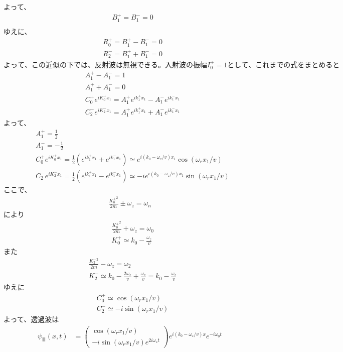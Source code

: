 よって、
\begin{align}
&B_{1}^{+}=B_{1}^{-}=0 \\
\end{align}
ゆえに、
\begin{align}
&R_{0}^{+}=B_{1}^{+}-B_{1}^{-}=0 \\
&R_{2}^{-}=B_{1}^{+}+B_{1}^{-}=0
\end{align}
$よって、この近似の下では、反射波は無視できる。入射波の振幅I_{0}^{+}=1として、これまでの式をまとめると$
\begin{align}
&A_{1}^{+}-A_{1}^{-}=1 \\
&A_{1}^{+}+A_{1}^{-}=0 \\
&C_{0}^{+}e^{iK_{0}^{+}x_{1}}=A_{1}^{+}e^{ik_{1}^{+}x_{1}}-A_{1}^{-}e^{ik_{1}^{-}x_{1}} \\
&C_{2}^{-}e^{iK_{2}^{-}x_{1}}=A_{1}^{+}e^{ik_{1}^{+}x_{1}}+A_{1}^{-}e^{ik_{1}^{-}x_{1}}
\end{align}
よって、
\begin{align}
&A_{1}^{+}=\frac{1}{2} \\
&A_{1}^{-}=-\frac{1}{2} \\
&C_{0}^{+}e^{iK_{0}^{+}x_{1}}=\frac{1}{2}(e^{ik_{1}^{+}x_{1}}+e^{ik_{1}^{-}x_{1}}){\simeq}e^{i(k_{0}-{\omega_{z}}/{v})x_{1}}\cos{({\omega_{r}}x_{1}/{v})} \\
&C_{2}^{-}e^{iK_{2}^{-}x_{1}}=\frac{1}{2}(e^{ik_{1}^{+}x_{1}}-e^{ik_{1}^{-}x_{1}}){\simeq}-ie^{i(k_{0}-{\omega_{z}}/{v})x_{1}}\sin{({\omega_{r}}x_{1}/{v})}
\end{align}
ここで、
\begin{align}
\frac{{K_{n}^{\pm}}^2}{2m}{\pm}\omega_{z}=\omega_{n}
\end{align}
により
\begin{align}
&\frac{{K_{0}^{+}}^2}{2m}+\omega_{z}=\omega_{0} \\
&K_{0}^{+}{\simeq}k_{0}-\frac{\omega_{z}}{v}
\end{align}
また
\begin{align}
&\frac{{K_{2}^{-}}^2}{2m}-\omega_{z}=\omega_{2} \\
&K_{2}^{-}{\simeq}k_{0}-\frac{2\omega_{z}}{v}+\frac{\omega_{z}}{v}=k_{0}-\frac{\omega_{z}}{v}
\end{align}
ゆえに
\begin{align}
&C_{0}^{+}{\simeq}\cos{({\omega_{r}}x_{1}/{v})} \\
&C_{2}^{-}{\simeq}-i\sin{({\omega_{r}}x_{1}/{v})}
\end{align}
よって、透過波は
\begin{align}
{\psi}_{Ⅲ}(x,t)
&=\begin{pmatrix}
\cos({{\omega_{r}}x_{1}/v}) \\
-i\sin({{\omega_{r}}x_{1}/v})e^{2i\omega_{z}t}
\end{pmatrix} 
e^{i(k_{0}-\omega_{z}/v)x}e^{-i\omega_{0}t}
\end{align}
